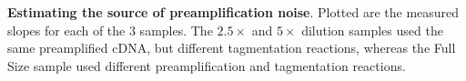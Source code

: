 \label{fig:noisesource} \textbf{Estimating the source of preamplification noise}.  Plotted are the measured slopes for each of the 3 samples.  The $2.5\times$ and $5\times$ dilution samples used the same preamplified cDNA, but different tagmentation reactions, whereas the Full Size sample used different preamplification and tagmentation reactions.
